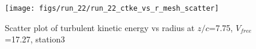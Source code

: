 \begin{figure}[H]
\centering
\texttt{[image: figs/run\_22/run\_22\_ctke\_vs\_r\_mesh\_scatter]}
\caption{Scatter plot of turbulent kinetic energy vs radius at $z/c$=7.75, $V_{free}$=17.27, station3}
\label{fig:run_22_ctke_vs_r_mesh_scatter}
\end{figure}



